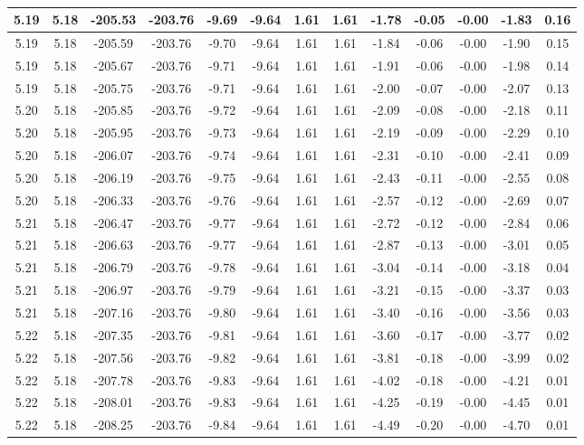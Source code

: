 \begin{table}[htbp]
\begin{adjustbox}{angle=90}
\begin{tabular}{|c|c|c|c|c|c|c|c|c|c|c|c|c|}
 5.19 & 5.18 & -205.53 & -203.76 & -9.69 & -9.64 & 1.61 & 1.61 & -1.78 & -0.05 & -0.00 & -1.83 & 0.16\\ \hline
 5.19 & 5.18 & -205.59 & -203.76 & -9.70 & -9.64 & 1.61 & 1.61 & -1.84 & -0.06 & -0.00 & -1.90 & 0.15\\ \hline
 5.19 & 5.18 & -205.67 & -203.76 & -9.71 & -9.64 & 1.61 & 1.61 & -1.91 & -0.06 & -0.00 & -1.98 & 0.14\\ \hline
 5.19 & 5.18 & -205.75 & -203.76 & -9.71 & -9.64 & 1.61 & 1.61 & -2.00 & -0.07 & -0.00 & -2.07 & 0.13\\ \hline
 5.20 & 5.18 & -205.85 & -203.76 & -9.72 & -9.64 & 1.61 & 1.61 & -2.09 & -0.08 & -0.00 & -2.18 & 0.11\\ \hline
 5.20 & 5.18 & -205.95 & -203.76 & -9.73 & -9.64 & 1.61 & 1.61 & -2.19 & -0.09 & -0.00 & -2.29 & 0.10\\ \hline
 5.20 & 5.18 & -206.07 & -203.76 & -9.74 & -9.64 & 1.61 & 1.61 & -2.31 & -0.10 & -0.00 & -2.41 & 0.09\\ \hline
 5.20 & 5.18 & -206.19 & -203.76 & -9.75 & -9.64 & 1.61 & 1.61 & -2.43 & -0.11 & -0.00 & -2.55 & 0.08\\ \hline
 5.20 & 5.18 & -206.33 & -203.76 & -9.76 & -9.64 & 1.61 & 1.61 & -2.57 & -0.12 & -0.00 & -2.69 & 0.07\\ \hline
 5.21 & 5.18 & -206.47 & -203.76 & -9.77 & -9.64 & 1.61 & 1.61 & -2.72 & -0.12 & -0.00 & -2.84 & 0.06\\ \hline
 5.21 & 5.18 & -206.63 & -203.76 & -9.77 & -9.64 & 1.61 & 1.61 & -2.87 & -0.13 & -0.00 & -3.01 & 0.05\\ \hline
 5.21 & 5.18 & -206.79 & -203.76 & -9.78 & -9.64 & 1.61 & 1.61 & -3.04 & -0.14 & -0.00 & -3.18 & 0.04\\ \hline
 5.21 & 5.18 & -206.97 & -203.76 & -9.79 & -9.64 & 1.61 & 1.61 & -3.21 & -0.15 & -0.00 & -3.37 & 0.03\\ \hline
 5.21 & 5.18 & -207.16 & -203.76 & -9.80 & -9.64 & 1.61 & 1.61 & -3.40 & -0.16 & -0.00 & -3.56 & 0.03\\ \hline
 5.22 & 5.18 & -207.35 & -203.76 & -9.81 & -9.64 & 1.61 & 1.61 & -3.60 & -0.17 & -0.00 & -3.77 & 0.02\\ \hline
 5.22 & 5.18 & -207.56 & -203.76 & -9.82 & -9.64 & 1.61 & 1.61 & -3.81 & -0.18 & -0.00 & -3.99 & 0.02\\ \hline
 5.22 & 5.18 & -207.78 & -203.76 & -9.83 & -9.64 & 1.61 & 1.61 & -4.02 & -0.18 & -0.00 & -4.21 & 0.01\\ \hline
 5.22 & 5.18 & -208.01 & -203.76 & -9.83 & -9.64 & 1.61 & 1.61 & -4.25 & -0.19 & -0.00 & -4.45 & 0.01\\ \hline
 5.22 & 5.18 & -208.25 & -203.76 & -9.84 & -9.64 & 1.61 & 1.61 & -4.49 & -0.20 & -0.00 & -4.70 & 0.01\\ \hline
            \end{tabular}
        \end{adjustbox}
        \caption{}
        \label{}
    \end{table}
    